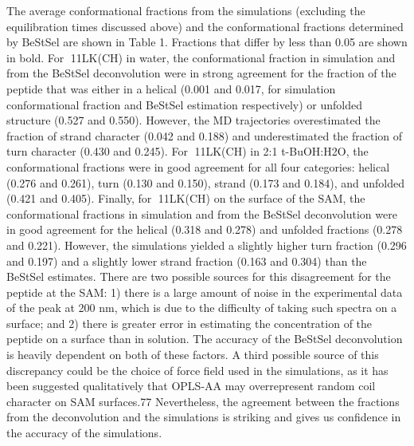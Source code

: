 The average conformational fractions from the simulations (excluding the equilibration times discussed above) and the conformational fractions determined by BeStSel are shown in Table 1. Fractions that differ by less than 0.05 are shown in bold. For 11LK(CH) in water, the conformational fraction in simulation and from the BeStSel deconvolution were in strong agreement for the fraction of the peptide that was either in a helical (0.001 and 0.017, for simulation conformational fraction and BeStSel estimation respectively) or unfolded structure (0.527 and 0.550). However, the MD trajectories overestimated the fraction of strand character (0.042 and 0.188) and underestimated the fraction of turn character (0.430 and 0.245). For 11LK(CH) in 2:1 t-BuOH:H2O, the conformational fractions were in good agreement for all four categories: helical (0.276 and 0.261), turn (0.130 and 0.150), strand (0.173 and 0.184), and unfolded (0.421 and 0.405). Finally, for 11LK(CH) on the surface of the SAM, the conformational fractions in simulation and from the BeStSel deconvolution were in good agreement for the helical (0.318 and 0.278) and unfolded fractions (0.278 and 0.221). However, the simulations yielded a slightly higher turn fraction (0.296 and 0.197) and a slightly lower strand fraction (0.163 and 0.304) than the BeStSel estimates. There are two possible sources for this disagreement for the peptide at the SAM: 1) there is a large amount of noise in the experimental data of the peak at 200 nm, which is due to the difficulty of taking such spectra on a surface; and 2) there is greater error in estimating the concentration of the peptide on a surface than in solution. The accuracy of the BeStSel deconvolution is heavily dependent on both of these factors. A third possible source of this discrepancy could be the choice of force field used in the simulations, as it has been suggested qualitatively that OPLS-AA may overrepresent random coil character on SAM surfaces.77 Nevertheless, the agreement between the fractions from the deconvolution and the simulations is striking and gives us confidence in the accuracy of the simulations.
